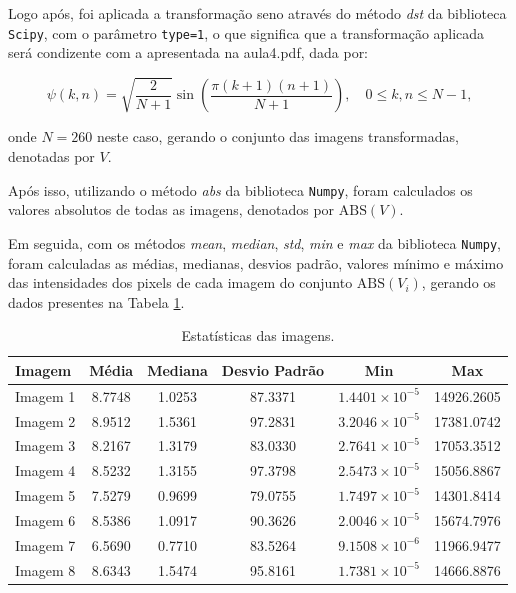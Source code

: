 \documentclass[a4paper, 11pt]{article}
\begin{document}
Logo após, foi aplicada a transformação seno através do método \textit{dst} da biblioteca \texttt{Scipy}, com o parâmetro \texttt{type=1}, o que significa que a transformação aplicada será condizente com a apresentada na aula4.pdf, dada por:

\begin{equation}
\psi(k, n) = \sqrt{\frac{2}{N + 1}} \sin\left( \frac{\pi (k + 1)(n + 1)}{N + 1} \right), \quad 0 \leq k, n \leq N - 1,
\end{equation}

onde \( N = 260 \) neste caso, gerando o conjunto das imagens transformadas, denotadas por \( V \).

Após isso, utilizando o método \textit{abs} da biblioteca \texttt{Numpy}, foram calculados os valores absolutos de todas as imagens, denotados por \( \text{ABS}(V) \).

Em seguida, com os métodos \textit{mean}, \textit{median}, \textit{std}, \textit{min} e \textit{max} da biblioteca \texttt{Numpy}, foram calculadas as médias, medianas, desvios padrão, valores mínimo e máximo das intensidades dos pixels de cada imagem do conjunto \( \text{ABS}(V_i) \), gerando os dados presentes na Tabela \ref{tab:4}.

\begin{table}[htbp]
\centering
\begin{tabular}{@{}lccccc@{}}
\toprule
\textbf{Imagem} & \textbf{Média} & \textbf{Mediana} & \textbf{Desvio Padrão} & \textbf{Min} & \textbf{Max} \\ \midrule
Imagem 1 & 8.7748 & 1.0253 & 87.3371 & $1.4401 \times 10^{-5}$ & 14926.2605 \\
Imagem 2 & 8.9512 & 1.5361 & 97.2831 & $3.2046 \times 10^{-5}$ & 17381.0742 \\
Imagem 3 & 8.2167 & 1.3179 & 83.0330 & $2.7641 \times 10^{-5}$ & 17053.3512 \\
Imagem 4 & 8.5232 & 1.3155 & 97.3798 & $2.5473 \times 10^{-5}$ & 15056.8867 \\
Imagem 5 & 7.5279 & 0.9699 & 79.0755 & $1.7497 \times 10^{-5}$ & 14301.8414 \\
Imagem 6 & 8.5386 & 1.0917 & 90.3626 & $2.0046 \times 10^{-5}$ & 15674.7976 \\
Imagem 7 & 6.5690 & 0.7710 & 83.5264 & $9.1508 \times 10^{-6}$ & 11966.9477 \\
Imagem 8 & 8.6343 & 1.5474 & 95.8161 & $1.7381 \times 10^{-5}$ & 14666.8876 \\ \bottomrule
\end{tabular}
\caption{Estatísticas das imagens.}
\label{tab:4}
\end{table}
\end{document}
